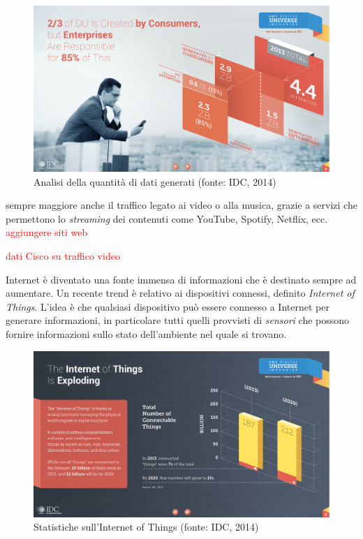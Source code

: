 \begin{figure}[ht]
	\centering
	\includegraphics[width=\textwidth]{1-introduzione/Immagini/dati-generati-consumer.pdf}
	\caption[Analisi della quantità di dati generati]{Analisi della quantità di dati generati (fonte: IDC, 2014)\label{fig:analisi-dati-generati}}
\end{figure}

\upe sempre maggiore anche il traffico legato ai video o alla musica, grazie a servizi che permettono lo \emph{streaming} dei contenuti come YouTube, Spotify, Netflix, ecc. \textcolor{red}{aggiungere siti web} 

\textcolor{red}{dati Cisco su traffico video}

Internet è diventato una fonte immensa di informazioni che è destinato sempre ad aumentare. Un recente trend è relativo ai dispositivi connessi, definito \emph{Internet of Things}. L'idea è che qualsiasi dispositivo può essere connesso a Internet per generare informazioni, in particolare tutti quelli provvisti di \emph{sensori} che possono fornire informazioni sullo stato dell'ambiente nel quale si trovano.

\begin{figure}[ht]
	\centering
	\includegraphics[width=\textwidth]{1-introduzione/Immagini/iot-trend.pdf}
	\caption[Statistiche sull'Internet of Things]{Statistiche sull'Internet of Things (fonte: IDC, 2014)\label{fig:statistiche-iot}}
\end{figure}

